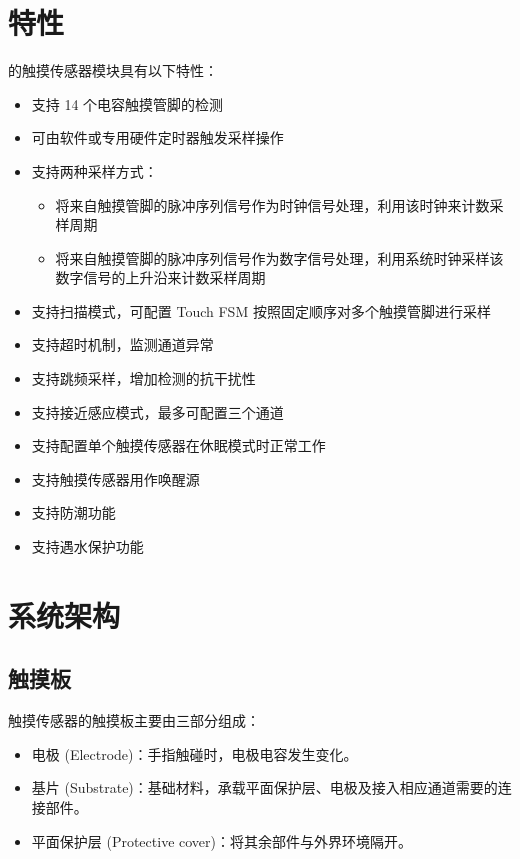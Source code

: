 \documentclass[main\_\_CN.tex]{subfiles}
\begin{document}
\section{特性}
\label{sec:tchsen-features}

\chipname{} 的触摸传感器模块具有以下特性：

\begin{itemize}
    \item 支持 14 个电容触摸管脚的检测
    \item 可由软件或专用硬件定时器触发采样操作
    \item 支持两种采样方式：
        \begin{itemize}
            \item 将来自触摸管脚的脉冲序列信号作为时钟信号处理，利用该时钟来计数采样周期
            \item 将来自触摸管脚的脉冲序列信号作为数字信号处理，利用系统时钟采样该数字信号的上升沿来计数采样周期
        \end{itemize}
    \item 支持扫描模式，可配置 Touch FSM 按照固定顺序对多个触摸管脚进行采样
    \item 支持超时机制，监测通道异常
    \item 支持跳频采样，增加检测的抗干扰性
    \item 支持接近感应模式，最多可配置三个通道
    \item 支持配置单个触摸传感器在休眠模式时正常工作
    \item 支持触摸传感器用作唤醒源
    \item 支持防潮功能
    \item 支持遇水保护功能
\end{itemize}



\section{系统架构}
\label{sec:tchsen-arch-overview}

\subsection{触摸板}

\chipname{} 触摸传感器的触摸板主要由三部分组成：

\begin{itemize}
    \item 电极 (Electrode)：手指触碰时，电极电容发生变化。
    \item 基片 (Substrate)：基础材料，承载平面保护层、电极及接入相应通道需要的连接部件。
    \item 平面保护层 (Protective cover)：将其余部件与外界环境隔开。
\end{itemize}
\end{document}
